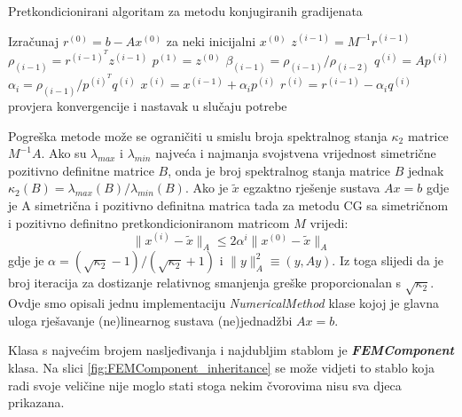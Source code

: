 \documentclass[a4paper,twoside,12pt]{memoir} %
\begin{document}
\begin{algorithm}[H]
\caption{Pretkondicionirani algoritam za metodu konjugiranih gradijenata}\label{code:pseudokod}
\begin{algorithmic}[1]
\State Izračunaj $r^{(0)} = b - A x^{(0)}$ za neki inicijalni $x^{(0)}$
    \State $z^{(i - 1)} = M^{-1}  r^{(i - 1)}$
    \State $\rho_{(i - 1)} = r^{(i - 1)^T} z^{(i - 1)}$
        \State $p^{(1)} = z^{(0)}$
    \Else
        \State $\beta_{(i - 1)} = \rho_{(i - 1)}/\rho_{(i - 2)} $
    \EndIf
    \State $q^{(i)} = A p^{(i)}$
    \State $\alpha_i = \rho_{(i - 1)} / p^{(i)^T} q^{(i)}$
    \State $x^{(i)} = x^{(i - 1)} + \alpha_i p^{(i)}$
    \State $r^{(i)} = r^{(i - 1)} - \alpha_i q^{(i)}$
    \State provjera konvergencije i nastavak u slučaju potrebe
\EndFor
\end{algorithmic}
\end{algorithm}

Pogreška metode može se ograničiti u smislu broja spektralnog stanja $\kappa_2$ matrice $M^{-1}A$. Ako su $\lambda_{max}$ i $\lambda_{min}$ najveća i najmanja svojstvena vrijednost simetrične pozitivno definitne matrice $B$, onda je broj spektralnog stanja matrice $B$ jednak $\kappa_2(B) = \lambda_{max}(B) / \lambda_{min}(B)$. Ako je $\tilde{x}$ egzaktno rješenje sustava $Ax = b$ gdje je A simetrična i pozitivno definitna matrica tada za metodu CG sa simetričnom i pozitivno definitno pretkondicioniranom matricom $M$ vrijedi:
\begin{equation}
    \lVert x^{(i)} - \tilde{x} \rVert_A \leqslant 2 \alpha^i \lVert x^{(0)} - \tilde{x} \rVert_A
\end{equation}
gdje je $\alpha = (\sqrt{\kappa_2} - 1) / (\sqrt{\kappa_2} + 1)$ i $\lVert y \rVert_A^2 \equiv (y, Ay)$. Iz toga slijedi da je broj iteracija za dostizanje relativnog smanjenja greške proporcionalan s $\sqrt{\kappa_2}$. Ovdje smo opisali jednu implementaciju \textit{NumericalMethod} klase kojoj je glavna uloga rješavanje (ne)linearnog sustava (ne)jednadžbi $Ax = b$. \par

Klasa s najvećim brojem nasljeđivanja i najdubljim stablom je \textbf{\textit{FEMComponent}} klasa. Na slici \ref{fig:FEMComponent_inheritance} se može vidjeti to stablo koja radi svoje veličine nije moglo stati stoga nekim čvorovima nisu sva djeca prikazana.
\end{document}
